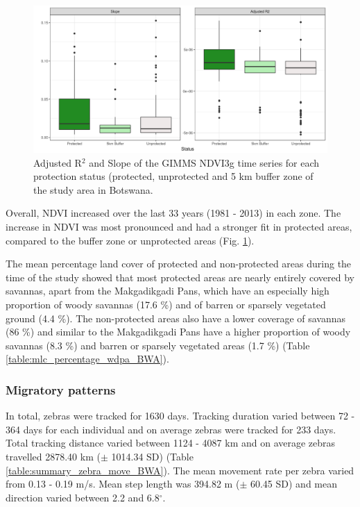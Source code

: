 \documentclass[12pt,a4paper, twoside, english]{article}
\begin{document}
\begin{figure}[H]
  \centering
  \includegraphics[width=\textwidth]{figures/Gimms_Status_NDVI_BWA.png}
  \caption[NDVI trend by protection status in Ngamiland]{Adjusted R$^{2}$ and Slope of the GIMMS NDVI3g time series for each protection status (protected, unprotected and 5 km buffer zone of the study area in Botswana.}
  \label{fig:gimms_status_bwa}
\end{figure}

Overall, NDVI increased over the last 33 years (1981 - 2013) in each zone. The increase in NDVI was most pronounced and had a stronger fit in protected areas, compared to the buffer zone or unprotected areas (Fig. \ref{fig:gimms_status_bwa}).

The mean percentage land cover of protected and non-protected areas during the time of the study showed that most protected areas are nearly entirely covered by savannas, apart from the Makgadikgadi Pans, which have an especially high proportion of woody savannas (17.6 \%) and of barren or sparsely vegetated ground (4.4 \%). The non-protected areas also have a lower coverage of savannas (86 \%) and similar to the Makgadikgadi Pans have a higher proportion of woody savannas (8.3 \%) and barren or sparsely vegetated areas (1.7 \%) (Table \ref{table:mlc_percentage_wdpa_BWA}).



\subsubsection{Migratory patterns}


In total, zebras were tracked for 1630 days. Tracking duration varied between 72 - 364 days for each individual and on average zebras were tracked for 233 days. Total tracking distance varied between 1124 - 4087 km and on average zebras travelled 2878.40 km ($\pm$ 1014.34 SD) (Table \ref{table:summary_zebra_move_BWA}). The mean movement rate per zebra varied from 0.13 - 0.19 m/s. Mean step length was 394.82 m ($\pm$ 60.45 SD) and mean direction varied between 2.2 and 6.8$^\circ$. 
\end{document}
